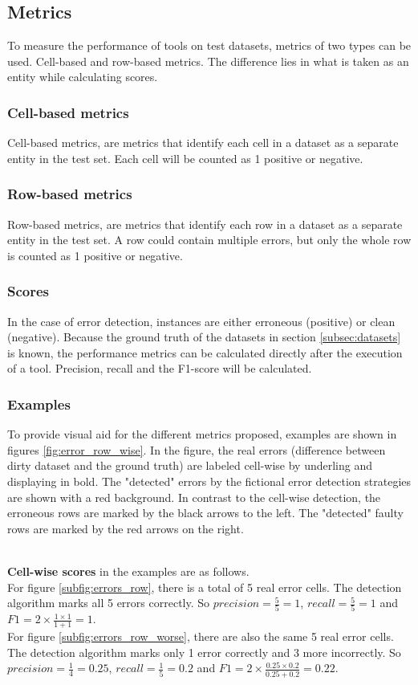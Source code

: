 \subsection{Metrics}
\label{subsec:metrics}
To measure the performance of tools on test datasets, metrics of two types can be used. Cell-based and row-based metrics. The difference lies in what is taken as an entity while calculating scores.

\subsubsection{Cell-based metrics}
Cell-based metrics, are metrics that identify each cell in a dataset as a separate entity in the test set. Each cell will be counted as 1 positive or negative. 

\subsubsection{Row-based metrics}
Row-based metrics, are metrics that identify each row in a dataset as a separate entity in the test set. A row could contain multiple errors, but only the whole row is counted as 1 positive or negative.

\subsubsection{Scores}
In the case of error detection, instances are either erroneous (positive) or clean (negative). Because the ground truth of the datasets in section \ref{subsec:datasets} is known, the performance metrics can be calculated directly after the execution of a tool. Precision, recall and the F1-score will be calculated.

\subsubsection{Examples}
To provide visual aid for the different metrics proposed, examples are shown in figures \ref{fig:error_row_wise}. In the figure, the real errors (difference between dirty dataset and the ground truth) are labeled cell-wise by underling and displaying in bold. The "detected" errors by the fictional error detection strategies are shown with a red background. In contrast to the cell-wise detection, the erroneous rows are marked by the black arrows to the left. The "detected" faulty rows are marked by the red arrows on the right.

~\\\textbf{Cell-wise scores} in the examples are as follows. 
\\For figure \ref{subfig:errors_row}, there is a total of 5 real error cells. The detection algorithm marks all 5 errors correctly. So $precision = \frac{5}{5} = 1$, $recall = \frac{5}{5} = 1$ and $F1 = 2 \times \frac{1 \times 1}{1 + 1} = 1$. 
\\For figure \ref{subfig:errors_row_worse}, there are also the same 5 real error cells. The detection algorithm marks only 1 error correctly and 3 more incorrectly. So $precision = \frac{1}{4} = 0.25$, $recall = \frac{1}{5} = 0.2$ and $F1 = 2 \times \frac{0.25 \times 0.2}{0.25 + 0.2} = 0.22$. 

